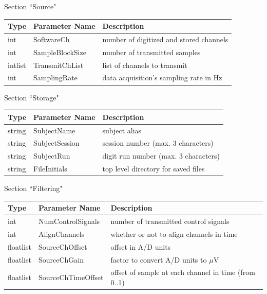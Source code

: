 \documentclass[letterpaper,oneside,12pt]{book}
\begin{document}
\begin{flushleft}
\raggedright \large Section ``Source" \normalsize
\\[2ex]
 \begin{tabular}{|l|l|l|}
  \hline
  \textbf{Type} & \textbf{Parameter Name} & \textbf{Description}\\
  \hline
  int & SoftwareCh & number of digitized and stored channels \\
  \hline
  int & SampleBlockSize & number of transmitted samples \\
  \hline
  intlist & TransmitChList & list of channels to transmit \\
  \hline
  int & SamplingRate & data acquisition's sampling rate in Hz \\
  \hline
 \end{tabular}

\vspace{.5cm}
\raggedright \large Section ``Storage" \normalsize
\\[2ex]
 \begin{tabular}{|l|l|l|}
  \hline
  \textbf{Type} & \textbf{Parameter Name} & \textbf{Description}\\
  \hline
  string & SubjectName & subject alias \\
  \hline
  string & SubjectSession & session number (max. 3 characters) \\
  \hline
  string & SubjectRun & digit run number (max. 3 characters) \\
  \hline
  string & FileInitials & top level directory for saved files \\
  \hline
 \end{tabular}

\vspace{.5cm}

\newpage

\large Section ``Filtering" \normalsize \\[1ex]

 \begin{tabular}{|l|l|l|}
  \hline
  \textbf{Type} & \textbf{Parameter Name} & \textbf{Description}\\
  \hline
  int & NumControlSignals & number of transmitted control signals \\
  \hline
  int & AlignChannels & whether or not to align channels in time \\
  \hline
  floatlist & SourceChOffset & offset in A/D units\\
  \hline
  floatlist & SourceChGain & factor to convert A/D units to $\mu$V \\
  \hline
  floatlist & SourceChTimeOffset & offset of sample at each channel in time (from 0..1) \\
  \hline
 \end{tabular}


\end{flushleft}
\end{document}
